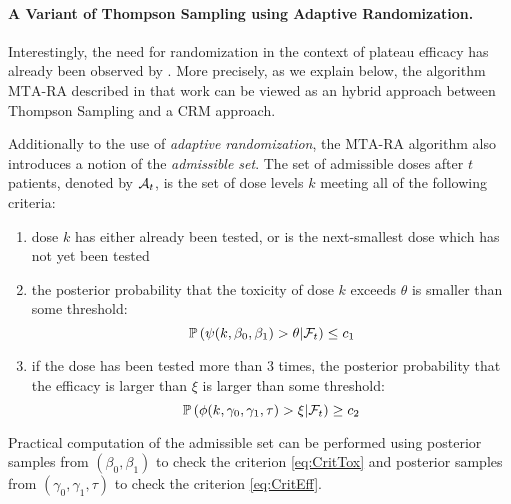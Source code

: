\paragraph{A Variant of Thompson Sampling using Adaptive Randomization.}

Interestingly, the need for randomization in the context of plateau efficacy has already been observed by \cite{MKR17}. More precisely, as we explain below, the algorithm $\mathrm{MTA}$-$\mathrm{RA}$ described in that work can be viewed as an hybrid approach between Thompson Sampling and a CRM approach. 

Additionally to the use of \emph{adaptive randomization}, the $\mathrm{MTA}$-$\mathrm{RA}$ algorithm also introduces a notion of the \emph{admissible set}. The set of admissible doses after $t$ patients, denoted by $\mathcal{A}_t$, is the set of dose levels $k$ meeting all of the following criteria:
\begin{enumerate}
    \item dose $k$ has either already been tested, or is the next-smallest dose which has not yet been tested
    \item the posterior probability that the toxicity of dose $k$ exceeds $\theta$ is smaller than some threshold: 
    \begin{equation}\mathbb{P}\left(\psi(k,\beta_0,\beta_1) > \theta | \mathcal{F}_{t}\right) \leq c_1\label{eq:CritTox}\end{equation}
    \item if the dose has been tested more than $3$ times, the posterior probability that the efficacy is larger than $\xi$ is larger than some threshold: 
    \begin{equation}\mathbb{P}\left(\phi(k,\gamma_0,\gamma_1,\tau) > \xi | \mathcal{F}_{t}\right) \geq c_2\label{eq:CritEff}\end{equation}
\end{enumerate}
Practical computation of the admissible set can be performed using posterior samples from $(\beta_0,\beta_1)$ to check the criterion \eqref{eq:CritTox} and posterior samples from $(\gamma_0,\gamma_1,\tau)$ to check the criterion \eqref{eq:CritEff}. 

